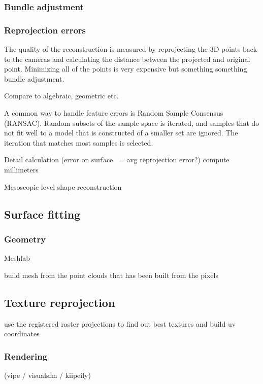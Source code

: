 \subsubsection{Bundle adjustment}

\subsubsection{Reprojection errors}

The quality of the reconstruction is measured by reprojecting the 3D points back to the cameras and calculating the distance between the projected and original point.
Minimizing all of the points is very expensive but something something bundle adjustment.

Compare to algebraic, geometric etc.

A common way to handle feature errors is Random Sample Consensus (RANSAC). Random subsets of the sample space is iterated, and samples that do not fit well to a model that is constructed of a smaller set are ignored. The iteration that matches most samples is selected.

Detail calculation (error on surface ~= avg reprojection error?) compute millimeters

Mesoscopic level shape reconstruction

\subsection{Surface fitting}

\subsubsection{Geometry}

Meshlab

build mesh from the point clouds that has been built from the pixels

\subsection{Texture reprojection}

use the registered raster projections to find out best textures and build uv coordinates

\subsubsection{Rendering}

(vipe / visualsfm / kiipeily)

